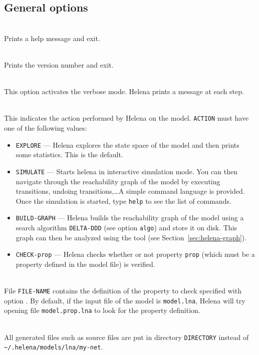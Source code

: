 \subsection{General options}
\begin{description}
\item{}\\ Prints a help message and exit.
\item{}\\ Prints the version number and exit.
\item{}\\ This option activates the verbose
  mode.  Helena prints a message at each step.
\item{}\\
  This indicates the action performed by Helena on the model.
  \texttt{ACTION} must have one of the following values:
  \begin{itemize}
  \item\texttt{EXPLORE} --- Helena explores the state space of the
    model and then prints some statistics.  This is the default.
  \item\texttt{SIMULATE} --- Starts helena in interactive simulation
    mode.  You can then navigate through the reachability graph of the
    model by executing transitions, undoing transitions,\ldots A
    simple command language is provided.  Once the simulation is
    started, type \texttt{help} to see the list of commands.
  \item\texttt{BUILD-GRAPH} --- Helena builds the reachability graph
    of the model using a search algorithm \texttt{DELTA-DDD} (see
    option \texttt{algo}) and store it on disk.  This graph can then
    be analyzed using the  tool (see
    Section~\ref{sec:helena-graph}).
  \item\texttt{CHECK-prop} --- Helena checks whether or not property
    \texttt{prop} (which must be a property defined in the model file)
    is verified.
  \end{itemize}
\item{}\\
  File \texttt{FILE-NAME} contains the definition of the property to
  check specified with option .  By
  default, if the input file of the model is \texttt{model.lna},
  Helena will try opening file \texttt{model.prop.lna} to look for the
  property definition.
\item{}\\
  All generated files such as source files are put in directory
  \texttt{DIRECTORY} instead of
  \texttt{\~{}/.helena/models/lna/my-net}.
\end{description}

